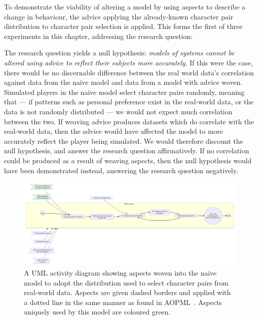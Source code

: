 To demonstrate the viability of altering a model by using aspects to describe a
change in behaviour, the advice applying the already-known character pair
distribution to character pair selection is applied. This forms the first of
three experiments in this chapter, addressing the research question:

\begin{researchquestion}
\rqone{}
\end{researchquestion}

The research question yields a null hypothesis: \emph{models of systems cannot
be altered using advice to reflect their subjects more accurately}. If this were
the case, there would be no discernable difference between the real world data's
correlation against data from the naive model and data from a model with advice
woven. Simulated players in the naive model select character pairs randomly,
meaning that --- if patterns such as personal preference exist in the real-world
data, or the data is not randomly distributed --- we would not expect much
correlation between the two. If weaving advice produces datasets which do
correlate with the real-world data, then the advice would have affected the
model to more accurately reflect the player being simulated. We would therefore
discount the null hypothesis, and answer the research question affirmatively. If
no correlation could be produced as a result of weaving aspects, then the null
hypothesis would have been demonstrated instead, answering the research question
negatively.

\begin{figure}[h]
  \centering
  \includegraphics[width=\columnwidth]{70_generality_of_aspects/diagrams/exp2_prior_distribution_model.pdf}
  \caption{A UML activity diagram showing aspects woven into the naive model to adopt the distribution used to
  select character pairs from real-world data. Aspects are given dashed borders
  and applied with a dotted line in the same manner as found in
  AOPML~\cite{Cappelli_AOBPM}. Aspects uniquely used by this
  model are coloured green.}
  \label{fig:exp1_prior_distribution_model}
\end{figure}

